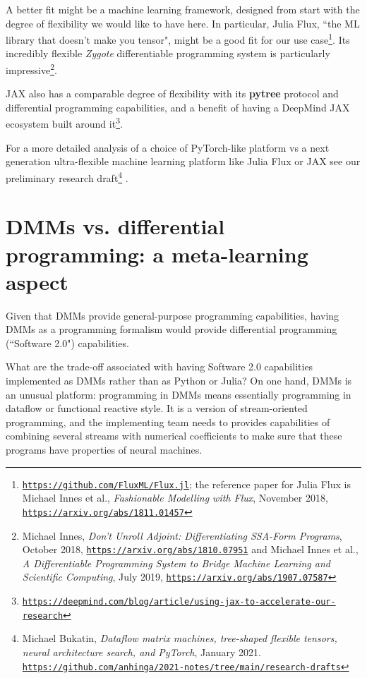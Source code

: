 \documentclass{article}
\begin{document}
A better fit might be a machine learning framework, designed from start with the degree of flexibility
we would like to have here. In particular, Julia Flux, ``the ML library that doesn't make you tensor", might be a good fit
for our use case\footnote{\href{https://github.com/FluxML/Flux.jl}{\tt https://github.com/FluxML/Flux.jl};
the reference paper for Julia Flux is Michael Innes et al., {\em Fashionable Modelling with Flux}, November 2018,
\href{https://arxiv.org/abs/1811.01457}{\tt https://arxiv.org/abs/1811.01457}}. Its incredibly flexible {\em Zygote}
differentiable programming system is particularly impressive\footnote{Michael Innes,
{\em Don't Unroll Adjoint: Differentiating SSA-Form Programs}, October 2018,
\href{https://arxiv.org/abs/1810.07951}{\tt https://arxiv.org/abs/1810.07951} and 
Michael Innes et al., {\em A Differentiable Programming System to Bridge Machine Learning and Scientific Computing}, 
July 2019, \href{https://arxiv.org/abs/1907.07587}{\tt https://arxiv.org/abs/1907.07587}}.

JAX also has a comparable degree of flexibility with its {\bf pytree} protocol and differential programming capabilities,
and a benefit of having a DeepMind JAX ecosystem built around 
it\footnote{\href{https://deepmind.com/blog/article/using-jax-to-accelerate-our-research}
{\tt https://deepmind.com/blog/article/using-jax-to-accelerate-our-research}}. 

For a more detailed analysis of a choice of PyTorch-like platform vs a next generation ultra-flexible
machine learning platform like Julia Flux or JAX see our preliminary research 
draft\footnote{Michael Bukatin, {\em Dataflow matrix machines, tree-shaped flexible tensors, neural architecture search, 
and PyTorch}, January 2021. \href{https://github.com/anhinga/2021-notes/tree/main/research-drafts}
{\tt https://github.com/anhinga/2021-notes/tree/main/research-drafts}} . 

\section{DMMs vs. differential programming: a meta-learning aspect}

Given that DMMs provide general-purpose programming capabilities, having DMMs as a programming
formalism would provide differential programming (``Software 2.0") capabilities.

What are the trade-off associated with having Software 2.0 capabilities implemented as DMMs rather
than as Python or Julia? On one hand, DMMs is an unusual platform: programming in DMMs
means essentially programming in dataflow or functional reactive style. It is a version of
stream-oriented programming, and the implementing team needs to provides capabilities of combining several streams with
numerical coefficients to make sure that these programs have properties of neural machines.
\end{document}
